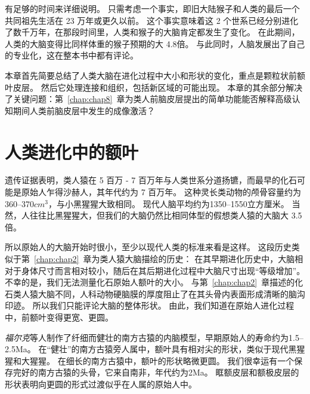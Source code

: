有足够的时间来详细说明。
只需考虑一个事实，即旧大陆猴子和人类的最后一个共同祖先生活在 23 万年或更久以前\cite{kay2004anthropoid,kumar2005placing}。
这个事实意味着这 2 个世系已经分别进化了数千万年，在那段时间里，人类和猴子的大脑肯定都发生了变化。
在此期间，人类的大脑变得比同样体重的猴子预期的大 4.8倍\cite{macleod2003expansion}。
与此同时，人脑发展出了自己的专业化，这在整本书中都有评论。
\par


本章首先简要总结了人类大脑在进化过程中大小和形状的变化，重点是颗粒状前额叶皮层。
然后它处理连接和组织，包括新区域的可能出现。
本章的其余部分解决了关键问题：第~\ref{chap:chap8}~章为类人前脑皮层提出的简单功能能否解释高级认知期间人类前脑皮层中发生的成像激活？



\section{人类进化中的额叶}

遗传证据表明，类人猿在 5 百万 - 7 百万年\cite{kumar2005placing}与人类世系分道扬镳，而最早的化石可能是原始人乍得沙赫人\cite{guy2005morphological}，其年代约为 7 百万年\cite{le2009mammal}。
这种灵长类动物的颅骨容量约为360–370$cm^3$，与小黑猩猩大致相同\cite{guy2005morphological}。
现代人脑平均约为1350–1550立方厘米\cite{sowell2007sex}。
当然，人往往比黑猩猩大，但我们的大脑仍然比相同体型的假想类人猿的大脑大 3.5倍\cite{macleod2003expansion}。
\par



所以原始人的大脑开始时很小，至少以现代人类的标准来看是这样。
这段历史类似于第~\ref{chap:chap2}~章为类人猿大脑描绘的历史：
在其早期进化历史中，大脑相对于身体尺寸而言相对较小，随后在其后期进化过程中大脑尺寸出现“等级增加”。
不幸的是，我们无法测量化石原始人额叶的大小。
与第~\ref{chap:chap2}~章描述的化石类人猿大脑不同，人科动物硬脑膜的厚度阻止了在其头骨内表面形成清晰的脑沟印迹。
所以我们只能评论大脑的整体形状。
由此，我们知道在原始人进化过程中，前额叶变得更宽、更圆。
\par


\textit{福尔克}等人\cite{falk2000early}制作了纤细而健壮的南方古猿的内脑模型，早期原始人的寿命约为1.5–2.5Ma。
在“健壮”的南方古猿旁人属中，额叶具有相对尖的形状，类似于现代黑猩猩和大猩猩。
在细长的南方古猿中，额叶的形状略微更圆。
我们很幸运有一个保存完好的南方古猿的头骨，它来自南非，年代约为2Ma\cite{carlson2011endocast}。
眶额皮层和额极皮层的形状表明向更圆的形式过渡似乎在人属的原始人中。
\par


